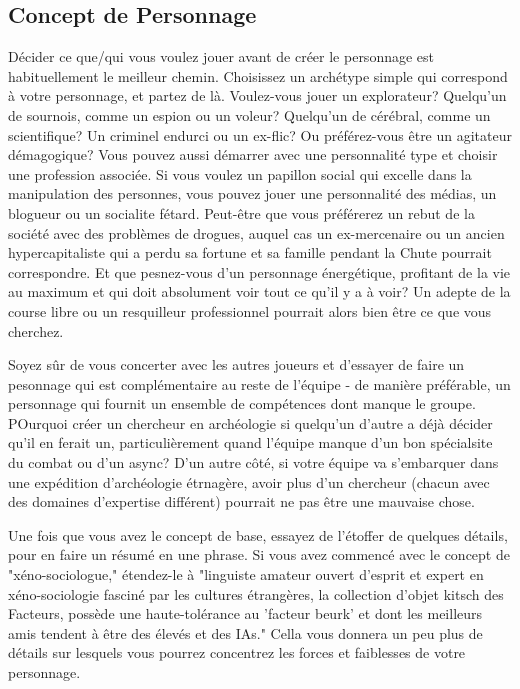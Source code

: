 \subsection{Concept de Personnage} \label{character-concept} 

Décider ce que/qui vous voulez jouer avant de créer le personnage est habituellement le meilleur chemin. Choisissez un archétype simple qui correspond à votre personnage, et partez de là. Voulez-vous jouer un explorateur? Quelqu'un de sournois, comme un espion ou un voleur? Quelqu'un de cérébral, comme un scientifique? Un criminel endurci ou un ex-flic? Ou préférez-vous être un agitateur démagogique? Vous pouvez aussi démarrer avec une personnalité type et choisir une profession associée. Si vous voulez un papillon social qui excelle dans la manipulation des personnes, vous pouvez jouer une personnalité des médias, un blogueur ou un socialite fétard. Peut-être que vous préférerez un rebut de la société avec des problèmes de drogues, auquel cas un ex-mercenaire ou un ancien hypercapitaliste qui a perdu sa fortune et sa famille pendant la Chute pourrait correspondre. Et que pesnez-vous d'un personnage énergétique, profitant de la vie au maximum et qui doit absolument voir tout ce qu'il y a à voir? Un adepte de la course libre ou un resquilleur professionnel pourrait alors bien être ce que vous cherchez. 

Soyez sûr de vous concerter avec les autres joueurs et d'essayer de faire un pesonnage qui est complémentaire au reste de l'équipe - de manière préférable, un personnage qui fournit un ensemble de compétences dont manque le groupe. POurquoi créer un chercheur en archéologie si quelqu'un d'autre a déjà décider qu'il en ferait un, particulièrement quand l'équipe manque d'un bon spécialsite du combat ou d'un async? D'un autre côté, si votre équipe va s'embarquer dans une expédition d'archéologie étrnagère, avoir plus d'un chercheur (chacun avec des domaines d'expertise différent) pourrait ne pas être une mauvaise chose. 

Une fois que vous avez le concept de base, essayez de l'étoffer de quelques détails, pour en faire un résumé en une phrase. Si vous avez commencé avec le concept de "xéno-sociologue," étendez-le à "linguiste amateur ouvert d'esprit et expert en xéno-sociologie fasciné par les cultures étrangères, la collection d'objet kitsch des Facteurs, possède une haute-tolérance au 'facteur beurk' et dont les meilleurs amis tendent à être des élevés et des IAs." Cella vous donnera un peu plus de détails sur lesquels vous pourrez concentrez les forces et faiblesses de votre personnage. 

